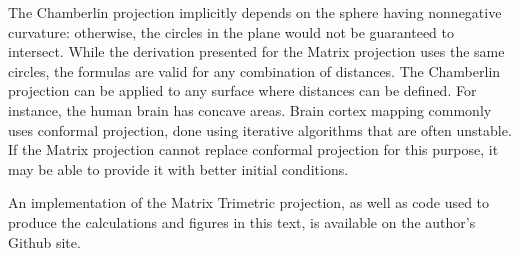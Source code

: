 \documentclass[]{interact}
\begin{document}
The Chamberlin projection implicitly depends on the sphere having nonnegative
curvature: otherwise, the circles in the plane would not be guaranteed to
intersect. While the derivation presented for the Matrix projection uses the
same circles, the formulas are valid for any combination of distances. The
Chamberlin projection can be applied to any surface where distances can be
defined. For instance, the human brain has concave areas. Brain cortex mapping
commonly uses conformal projection,
done using iterative algorithms that are often unstable.\cite{angenent}
If the Matrix projection cannot replace conformal projection for this purpose,
it may be able to provide it with better initial conditions.

An implementation of the Matrix Trimetric projection, as well as code used to
produce the calculations and figures in this text,
is available on the author's Github site.\citep{blind}%





\end{document}
